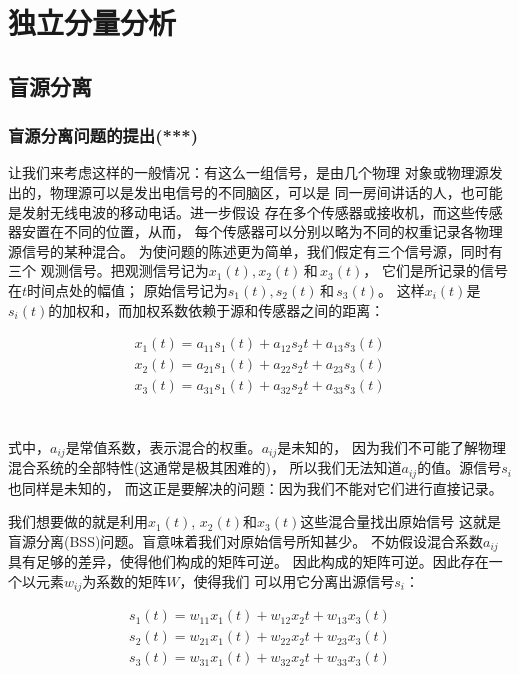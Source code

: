 ﻿%

\chapter{独立分量分析}
\label{chap02}
\section{盲源分离}

\subsection{盲源分离问题的提出(***)}
    让我们来考虑这样的一般情况：有这么一组信号，是由几个物理
对象或物理源发出的，物理源可以是发出电信号的不同脑区，可以是
同一房间讲话的人，也可能是发射无线电波的移动电话。进一步假设
存在多个传感器或接收机，而这些传感器安置在不同的位置，从而，
每个传感器可以分别以略为不同的权重记录各物理源信号的某种混合。
    为使问题的陈述更为简单，我们假定有三个信号源，同时有三个
观测信号。把观测信号记为$x_1(t), x_2(t) \,\mbox{和}\, x_3(t)$，
它们是所记录的信号在$t$时间点处的幅值；
原始信号记为$s_1(t), s_2(t)\,和\,s_3(t)$。
这样$x_i(t)$是$s_i(t)$的加权和，而加权系数依赖于源和传感器之间的距离：

\parbox{10cm}{
\begin{eqnarray*}
x_1(t)=a_{11}s_1(t)+a_{12}s_2{t}+a_{13}s_3(t) \\
x_2(t)=a_{21}s_1(t)+a_{22}s_2{t}+a_{23}s_3(t) \\
x_3(t)=a_{31}s_1(t)+a_{32}s_2{t}+a_{33}s_3(t) \\
\end{eqnarray*}
}\hfill
\parbox{3cm}{\begin{eqnarray} \label{bss_compose}\end{eqnarray}}

式中，$a_{ij}$是常值系数，表示混合的权重。$a_{ij}$是未知的，
因为我们不可能了解物理混合系统的全部特性(这通常是极其困难的)，
所以我们无法知道$a_{ij}$的值。源信号$s_i$也同样是未知的，
而这正是要解决的问题：因为我们不能对它们进行直接记录。
    
我们想要做的就是利用$x_1(t)$, $x_2(t)$和$x_3(t)$这些混合量找出原始信号
这就是盲源分离(BSS)问题。盲意味着我们对原始信号所知甚少。
    不妨假设混合系数$a_{ij}$具有足够的差异，使得他们构成的矩阵可逆。
因此构成的矩阵可逆。因此存在一个以元素$w_{ij}$为系数的矩阵$W$，使得我们
可以用它分离出源信号$s_i$：
 
\parbox{10cm}{
\begin{eqnarray*}
s_1(t)=w_{11}x_1(t)+w_{12}x_2{t}+w_{13}x_3(t) \\
s_2(t)=w_{21}x_1(t)+w_{22}x_2{t}+w_{23}x_3(t) \\
s_3(t)=w_{31}x_1(t)+w_{32}x_2{t}+w_{33}x_3(t) \\
\end{eqnarray*}
}\hfill
\parbox{3cm}{\begin{eqnarray}\label{bss_slover} \end{eqnarray}}

